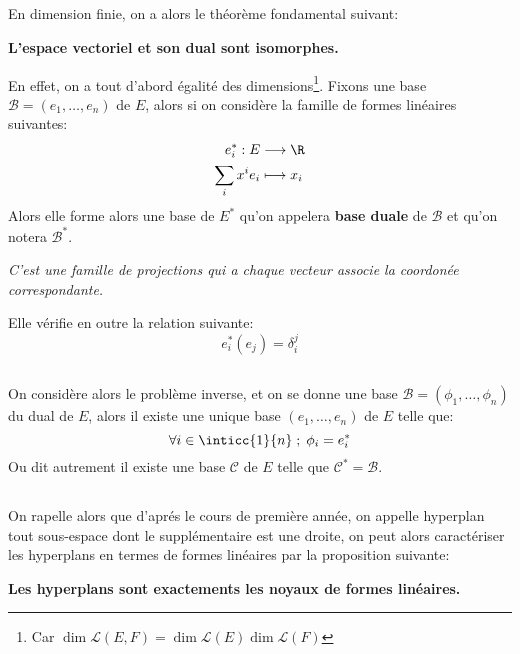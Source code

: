 \subsection*{}
En dimension finie, on a alors le théorème fondamental suivant:
\begin{center}
   \textbf{L'espace vectoriel et son dual sont isomorphes.}
\end{center}
En effet, on a tout d'abord égalité des dimensions\footnote[2]{Car \(\dim\mathcal{L}(E, F) = \dim\mathcal{L}(E)\dim\mathcal{L}(F)\)}. Fixons une base \(\mathscr{B} = (e_1, \ldots, e_n)\) de \(E\), alors si on considère la famille de formes linéaires suivantes:
\[
   \begin{aligned}
      e_i^* : E &\longrightarrow \R \\
      \sum_{i}x^ie_i &\longmapsto x_i
   \end{aligned}
\]
Alors elle forme alors une base de \(E^*\) qu'on appelera \textbf{base duale} de \(\mathscr{B}\) et qu'on notera \(\mathscr{B}^*\).
\begin{center}
   \textit{C'est une famille de projections qui a chaque vecteur associe la coordonée correspondante.}
\end{center}
Elle vérifie en outre la relation suivante:
\[
   e_i^*(e_j) = \delta_{i}^j
\]

\subsection*{}
On considère alors le problème inverse, et on se donne une base \(\mathscr{B} = (\phi_1, \ldots, \phi_n)\) du dual de \(E\), alors il existe une unique base \((e_1, \ldots, e_n)\) de \(E\) telle que:
\[
   \forall i \in \inticc{1}{n} \; ; \; \phi_i = e_i^*   
\] 
Ou dit autrement il existe une base \(\mathscr{C}\) de \(E\) telle que \(\mathscr{C}^* = \mathscr{B}\).

\subsection*{}
On rapelle alors que d'aprés le cours de première année, on appelle hyperplan tout sous-espace dont le supplémentaire est une droite, on peut alors caractériser les hyperplans en termes de formes linéaires par la proposition suivante:
\begin{center}
   \textbf{Les hyperplans sont exactements les noyaux de formes linéaires.}
\end{center}

